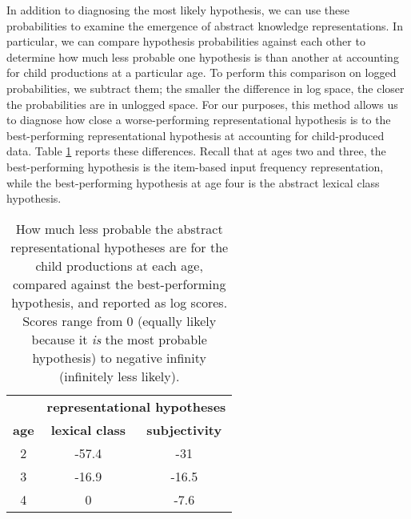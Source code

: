 \documentclass[10pt]{article}
\newcommand{\gkb}[1]{\textcolor{magenta}{[gkb: #1]}}
\newcommand{\lsp}[1]{\textcolor{violet}{[lsp: #1]}}
\begin{document}
In addition to diagnosing the most likely hypothesis, we can use these probabilities to examine the emergence of abstract knowledge representations. In particular, we can compare hypothesis probabilities against each other to determine how much less probable one hypothesis is than another at accounting for child productions at a particular age. To perform this comparison on logged probabilities, we subtract them; 
the smaller the difference in log space, the closer the probabilities are in unlogged space. For our purposes, this method allows us to diagnose how close a worse-performing representational hypothesis is to the best-performing representational hypothesis at accounting for child-produced data. 
Table \ref{tab:differencescores} reports these differences. Recall that at ages two and three, the best-performing hypothesis is the item-based input frequency representation, while the best-performing hypothesis at age four is the abstract lexical class hypothesis.


\begin{table}[!ht]
\begin{center}
\begin{tabular}{ |c|c|c| }
\hline
\multicolumn{1}{|c}{} &
\multicolumn{2}{|c|}{\textbf{representational hypotheses}} \\
 \cline{2-3}%
 \textbf{age} & \textbf{lexical class} & \textbf{subjectivity} \\ 
 \hline
 2  & -57.4 & -31 \\ 
 \hline
 3  & -16.9 & -16.5 \\ 
 \hline
 4 & 0  & -7.6 \\ 
 \hline
\end{tabular}
\end{center}
\vspace{-5mm} %
\caption{How much less probable the abstract representational hypotheses are for the child productions at each age, compared against the best-performing hypothesis, and reported as log scores. Scores range from 0 (equally likely because it \textit{is} the most probable hypothesis) to negative infinity (infinitely less likely). %
}
\label{tab:differencescores}
\end{table}
\end{document}
